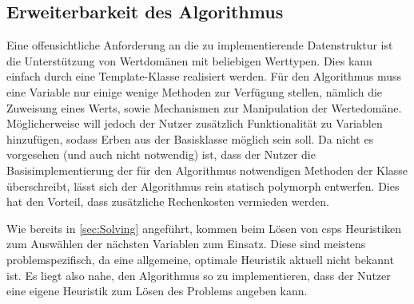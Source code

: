 \subsection{Erweiterbarkeit des Algorithmus}
Eine offensichtliche Anforderung an die zu implementierende Datenstruktur  ist die Unterstützung von Wertdomänen mit beliebigen Werttypen. Dies kann einfach durch
eine Template-Klasse realisiert werden. Für den Algorithmus muss eine Variable nur einige wenige Methoden zur Verfügung stellen, nämlich die Zuweisung eines Werts, sowie Mechanismen
zur Manipulation der Wertedomäne. Möglicherweise will jedoch der Nutzer zusätzlich Funktionalität zu Variablen hinzufügen, sodass Erben aus der Basisklasse 
möglich sein soll. Da nicht es vorgesehen (und auch nicht notwendig) ist, dass der Nutzer die Basisimplementierung der für den Algorithmus notwendigen Methoden der Klasse
 überschreibt, lässt sich der Algorithmus rein statisch polymorph entwerfen. Dies hat den Vorteil, dass zusätzliche Rechenkosten vermieden werden.

Wie bereits in \cref{sec:Solving} angeführt, kommen beim Lösen von \acp{csp} Heuristiken zum Auswählen der nächsten Variablen zum Einsatz. Diese sind meistens problemspezifisch,
da eine allgemeine, optimale Heuristik aktuell nicht bekannt ist. Es liegt also nahe, den Algorithmus so zu implementieren, dass der Nutzer eine eigene Heuristik zum Lösen des
Problems angeben kann.
